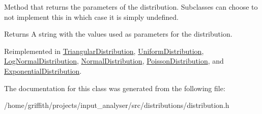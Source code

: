 Method that returns the parameters of the distribution. Subclasses can choose to not implement this in which case it is simply undefined. \begin{DoxyReturn}{Returns}
A string with the values used as parameters for the distribution. 
\end{DoxyReturn}


Reimplemented in \hyperlink{classTriangularDistribution_af54199e88d5c537fe621ae177b86a9d6}{Triangular\+Distribution}, \hyperlink{classUniformDistribution_a9e276cfa4ff3021a0e4b1b4edd8a1c67}{Uniform\+Distribution}, \hyperlink{classLogNormalDistribution_a5dfd7c43d883d868dab5d62e55a7e610}{Log\+Normal\+Distribution}, \hyperlink{classNormalDistribution_acedea04da0d96d01ed5c7fde83a56e1c}{Normal\+Distribution}, \hyperlink{classPoissonDistribution_a48e471c3bcae5b197a576f61777e67f3}{Poisson\+Distribution}, and \hyperlink{classExponentialDistribution_aa6f3a3208a0ec5f4b7f5fa8a36938c89}{Exponential\+Distribution}.



The documentation for this class was generated from the following file\+:\begin{DoxyCompactItemize}
\item 
/home/griffith/projects/input\+\_\+analyser/src/distributions/distribution.\+h\end{DoxyCompactItemize}
